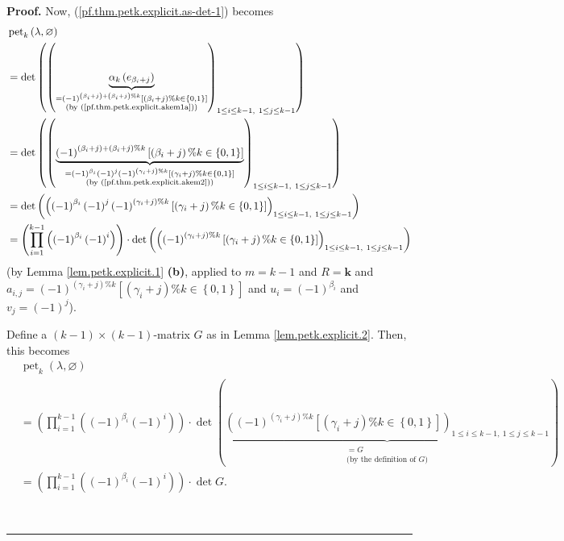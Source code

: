 \documentclass[numbers=enddot,12pt,final,onecolumn,notitlepage]{scrartcl}%
\theoremstyle{definition}
\newenvironment{proof}[1][Proof]{\noindent\textbf{#1.} }{\ \rule{0.5em}{0.5em}}
\let\prodnonlimits\prod
\renewcommand{\prod}{\prodnonlimits\limits}
\begin{document}
\begin{proof}
Now, (\ref{pf.thm.petk.explicit.as-det-1}) becomes%
\begin{align*}
&  \operatorname*{pet}\nolimits_{k}\left(  \lambda,\varnothing\right) \\
&  =\det\left(  \left(  \underbrace{\alpha_{k}\left(  e_{\beta_{i}+j}\right)
}_{\substack{=\left(  -1\right)  ^{\left(  \beta_{i}+j\right)  +\left(
\beta_{i}+j\right)  \%k}\left[  \left(  \beta_{i}+j\right)  \%k\in\left\{
0,1\right\}  \right]  \\\text{(by (\ref{pf.thm.petk.explicit.akem1a}))}%
}}\right)  _{1\leq i\leq k-1,\ 1\leq j\leq k-1}\right) \\
&  =\det\left(  \left(  \underbrace{\left(  -1\right)  ^{\left(  \beta
_{i}+j\right)  +\left(  \beta_{i}+j\right)  \%k}\left[  \left(  \beta
_{i}+j\right)  \%k\in\left\{  0,1\right\}  \right]  }_{\substack{=\left(
-1\right)  ^{\beta_{i}}\left(  -1\right)  ^{j}\left(  -1\right)  ^{\left(
\gamma_{i}+j\right)  \%k}\left[  \left(  \gamma_{i}+j\right)  \%k\in\left\{
0,1\right\}  \right]  \\\text{(by (\ref{pf.thm.petk.explicit.akem2}))}%
}}\right)  _{1\leq i\leq k-1,\ 1\leq j\leq k-1}\right) \\
&  =\det\left(  \left(  \left(  -1\right)  ^{\beta_{i}}\left(  -1\right)
^{j}\left(  -1\right)  ^{\left(  \gamma_{i}+j\right)  \%k}\left[  \left(
\gamma_{i}+j\right)  \%k\in\left\{  0,1\right\}  \right]  \right)  _{1\leq
i\leq k-1,\ 1\leq j\leq k-1}\right) \\
&  =\left(  \prod_{i=1}^{k-1}\left(  \left(  -1\right)  ^{\beta_{i}}\left(
-1\right)  ^{i}\right)  \right)  \cdot\det\left(  \left(  \left(  -1\right)
^{\left(  \gamma_{i}+j\right)  \%k}\left[  \left(  \gamma_{i}+j\right)
\%k\in\left\{  0,1\right\}  \right]  \right)  _{1\leq i\leq k-1,\ 1\leq j\leq
k-1}\right)
\end{align*}
(by Lemma \ref{lem.petk.explicit.1} \textbf{(b)}, applied to $m=k-1$ and
$R=\mathbf{k}$ and \newline$a_{i,j}=\left(  -1\right)  ^{\left(  \gamma
_{i}+j\right)  \%k}\left[  \left(  \gamma_{i}+j\right)  \%k\in\left\{
0,1\right\}  \right]  $ and $u_{i}=\left(  -1\right)  ^{\beta_{i}}$ and
$v_{j}=\left(  -1\right)  ^{j}$).

Define a $\left(  k-1\right)  \times\left(  k-1\right)  $-matrix $G$ as in
Lemma \ref{lem.petk.explicit.2}. Then, this becomes%
\begin{align}
&  \operatorname*{pet}\nolimits_{k}\left(  \lambda,\varnothing\right)
\nonumber\\
&  =\left(  \prod_{i=1}^{k-1}\left(  \left(  -1\right)  ^{\beta_{i}}\left(
-1\right)  ^{i}\right)  \right)  \cdot\det\left(  \underbrace{\left(  \left(
-1\right)  ^{\left(  \gamma_{i}+j\right)  \%k}\left[  \left(  \gamma
_{i}+j\right)  \%k\in\left\{  0,1\right\}  \right]  \right)  _{1\leq i\leq
k-1,\ 1\leq j\leq k-1}}_{\substack{=G\\\text{(by the definition of }G\text{)}%
}}\right) \nonumber\\
&  =\left(  \prod_{i=1}^{k-1}\left(  \left(  -1\right)  ^{\beta_{i}}\left(
-1\right)  ^{i}\right)  \right)  \cdot\det G.
\label{pf.thm.petk.explicit.petk-via-G}%
\end{align}



\end{proof}
\end{document}
